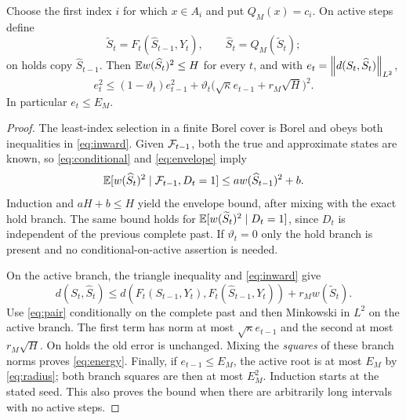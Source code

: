 \begin{lemma}\label{lem:recursion}
Choose the first index $i$ for which $x\in A_i$ and put $Q_M(x)=c_i$. On active steps define
\begin{equation}\label{eq:machine}
 \widetilde S_t=F_t(\widehat S_{t-1},Y_t),\qquad
 \widehat S_t=Q_M(\widetilde S_t);
\end{equation}
on holds copy $\widehat S_{t-1}$. Then $\mathbb E w(\widehat S_t)^2\le H$ for every $t$, and with $e_t=\left\lVert d(S_t,\widehat S_t)\right\rVert_{L^2}$,
\begin{equation}\label{eq:energy}
 e_t^2\le(1-\vartheta_t)e_{t-1}^2+
 \vartheta_t\big(\sqrt\kappa e_{t-1}+r_M\sqrt H\big)^2.
\end{equation}
In particular $e_t\le E_M$.
\end{lemma}
\begin{proof}
The least-index selection in a finite Borel cover is Borel and obeys both inequalities in \eqref{eq:inward}. Given $\mathcal F_{t-1}$, both the true and approximate states are known, so \eqref{eq:conditional} and \eqref{eq:envelope} imply
\[
 \mathbb E[w(\widehat S_t)^2\mid\mathcal F_{t-1},D_t=1]
 \le a w(\widehat S_{t-1})^2+b.
\]
Induction and $aH+b\le H$ yield the envelope bound, after mixing with the exact hold branch. The same bound holds for $\mathbb E[w(\widetilde S_t)^2\mid D_t=1]$, since $D_t$ is independent of the previous complete past. If $\vartheta_t=0$ only the hold branch is present and no conditional-on-active assertion is needed.

On the active branch, the triangle inequality and \eqref{eq:inward} give
\[
 d(S_t,\widehat S_t)
 \le d(F_t(S_{t-1},Y_t),F_t(\widehat S_{t-1},Y_t))
       +r_Mw(\widetilde S_t).
\]
Use \eqref{eq:pair} conditionally on the complete past and then Minkowski in $L^2$ on the active branch. The first term has norm at most $\sqrt\kappa e_{t-1}$ and the second at most $r_M\sqrt H$. On holds the old error is unchanged. Mixing the \emph{squares} of these branch norms proves \eqref{eq:energy}. Finally, if $e_{t-1}\le E_M$, the active root is at most $E_M$ by \eqref{eq:radius}; both branch squares are then at most $E_M^2$. Induction starts at the stated seed. This also proves the bound when there are arbitrarily long intervals with no active steps.
\end{proof}

